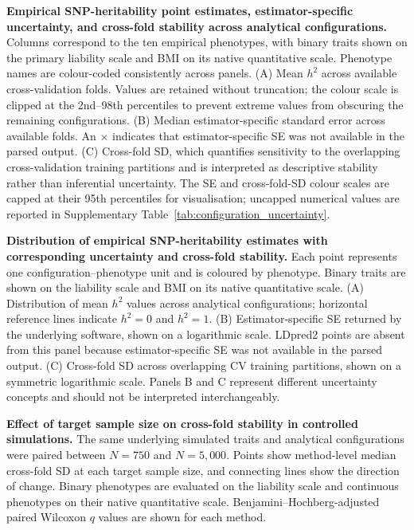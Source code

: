 
\caption{\textbf{Empirical SNP-heritability point estimates, estimator-specific uncertainty, and cross-fold stability across analytical configurations.} Columns correspond to the ten empirical phenotypes, with binary traits shown on the primary liability scale and BMI on its native quantitative scale. Phenotype names are colour-coded consistently across panels. (A) Mean $h^2$ across available cross-validation folds. Values are retained without truncation; the colour scale is clipped at the 2nd--98th percentiles to prevent extreme values from obscuring the remaining configurations. (B) Median estimator-specific standard error across available folds. An $\times$ indicates that estimator-specific SE was not available in the parsed output. (C) Cross-fold SD, which quantifies sensitivity to the overlapping cross-validation training partitions and is interpreted as descriptive stability rather than inferential uncertainty. The SE and cross-fold-SD colour scales are capped at their 95th percentiles for visualisation; uncapped numerical values are reported in Supplementary Table~\ref{tab:configuration_uncertainty}.}

\caption{\textbf{Distribution of empirical SNP-heritability estimates with corresponding uncertainty and cross-fold stability.} Each point represents one configuration--phenotype unit and is coloured by phenotype. Binary traits are shown on the liability scale and BMI on its native quantitative scale. (A) Distribution of mean $h^2$ values across analytical configurations; horizontal reference lines indicate $h^2=0$ and $h^2=1$. (B) Estimator-specific SE returned by the underlying software, shown on a logarithmic scale. LDpred2 points are absent from this panel because estimator-specific SE was not available in the parsed output. (C) Cross-fold SD across overlapping CV training partitions, shown on a symmetric logarithmic scale. Panels B and C represent different uncertainty concepts and should not be interpreted interchangeably.}

\caption{\textbf{Effect of target sample size on cross-fold stability in controlled simulations.} The same underlying simulated traits and analytical configurations were paired between $N=750$ and $N=5{,}000$. Points show method-level median cross-fold SD at each target sample size, and connecting lines show the direction of change. Binary phenotypes are evaluated on the liability scale and continuous phenotypes on their native quantitative scale. Benjamini--Hochberg-adjusted paired Wilcoxon $q$ values are shown for each method.}